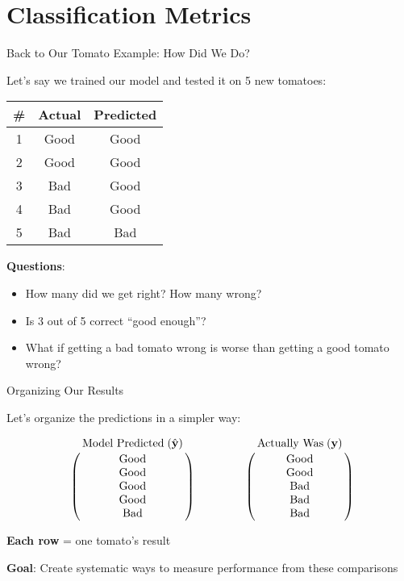 \documentclass[usenames,dvipsnames]{beamer}
\begin{document}
\section{Classification Metrics}

\begin{frame}{Back to Our Tomato Example: How Did We Do?}

Let's say we trained our model and tested it on 5 new tomatoes:

\begin{table}[]
	\begin{tabular}{|c|c||c|}
		\hline 
		\textbf{\#} & \textbf{Actual} & \textbf{Predicted} \\ \hline 
		1 & Good & Good \\
		2 & Good & Good \\
		3 & Bad & Good \\
		4 & Bad & Good \\
		5 & Bad & Bad \\ \hline
	\end{tabular}
\end{table}

\pause \textbf{Questions}: 
\begin{itemize}
	\item How many did we get right? How many wrong?
	\item Is 3 out of 5 correct ``good enough''?
	\item What if getting a bad tomato wrong is worse than getting a good tomato wrong?
\end{itemize}
\end{frame}

\begin{frame}{Organizing Our Results}

Let's organize the predictions in a simpler way:

$$\bordermatrix{&\text{Model Predicted}\;(\yhat)\cr
                &\text{Good}\cr
                &\text{Good}\cr
                &\text{Good}\cr
                &\text{Good}\cr
                &\text{Bad}}
                \qquad \qquad
   \bordermatrix{&\text{Actually Was}\;(\vy)\cr
                &\text{Good}\cr
                &\text{Good}\cr
                &\text{Bad}\cr
                &\text{Bad}\cr
                &\text{Bad}}
$$

\pause \textbf{Each row} = one tomato's result

\textbf{Goal}: Create systematic ways to measure performance from these comparisons
\end{frame}
\end{document}

